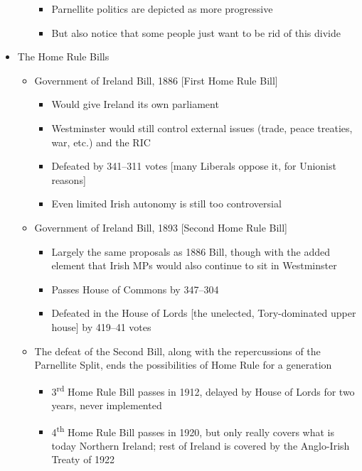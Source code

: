 \documentclass[12pt]{article}
\def\th{\textsuperscript{th}}
\begin{document}
\begin{itemize}
\begin{itemize}
\begin{itemize}
                        \item Parnellite politics are depicted as more progressive
                        \item But also notice that some people just want to be rid of this divide
                    \end{itemize}
                \end{itemize}
                \item The Home Rule Bills
                \begin{itemize}
                    \item Government of Ireland Bill, 1886 [First Home Rule Bill]
                    \begin{itemize}
                        \item Would give Ireland its own parliament
                        \item Westminster would still control external issues (trade, peace treaties, war, etc.) and the RIC
                        \item Defeated by 341--311 votes [many Liberals oppose it, for Unionist reasons]
                        \item Even limited Irish autonomy is still too controversial
                    \end{itemize}
                    \item Government of Ireland Bill, 1893 [Second Home Rule Bill]
                    \begin{itemize}
                        \item Largely the same proposals as 1886 Bill, though with the added element that Irish MPs would also continue to sit in Westminster
                        \item Passes House of Commons by 347--304
                        \item Defeated in the House of Lords [the unelected, Tory-dominated upper house] by 419--41 votes
                    \end{itemize}
                    \item The defeat of the Second Bill, along with the repercussions of the Parnellite Split, ends the possibilities of Home Rule for a generation
                    \begin{itemize}
                        \item 3\textsuperscript{rd} Home Rule Bill passes in 1912, delayed by House of Lords for two years, never implemented
                        \item 4\th{} Home Rule Bill passes in 1920, but only really covers what is today Northern Ireland; rest of Ireland is covered by the Anglo-Irish Treaty of 1922
                    \end{itemize}
                \end{itemize}
            \end{itemize}
            \newpage
\end{document}
